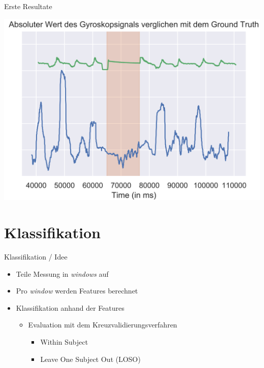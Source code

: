\documentclass[18pt]{beamer}
\begin{document}
\begin{frame}{Erste Resultate}
    \begin{center}
        \includegraphics[scale=0.16]{images/data_analyzation/compare_raw_signal_with_flowDr_2.png}
    \end{center}
\end{frame}

\section{Klassifikation}
\begin{frame}{Klassifikation / Idee}
\begin{itemize}
    \item Teile Messung in \textit{windows} auf
    \item Pro \textit{window} werden Features berechnet
    \item Klassifikation anhand der Features
    \begin{itemize}
        \item Evaluation mit dem Kreuzvalidierungsverfahren
        \begin{itemize}
            \item Within Subject
            \item Leave One Subject Out (LOSO)
        \end{itemize}
    \end{itemize}
\end{itemize}
\end{frame}
\end{document}
